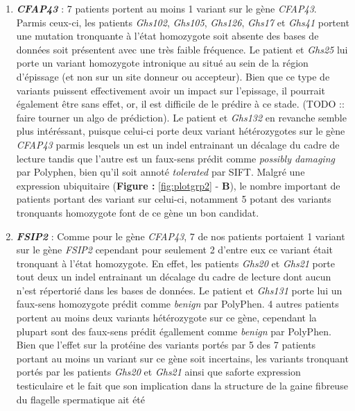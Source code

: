 \documentclass[12pt,twoside]{reedthesis}
\theoremstyle{definition}
\theoremstyle{definition}
\theoremstyle{remark}
\begin{document}
  \begin{enumerate}
  \def\labelenumi{\arabic{enumi}.}
  \item
    \textbf{\emph{CFAP43}} : 7 patients portent au moins 1 variant sur le
    gène \emph{CFAP43}. Parmis ceux-ci, les patients \emph{Ghs102},
    \emph{Ghs105}, \emph{Ghs126}, \emph{Ghs17} et \emph{Ghs41} portent une
    mutation tronquante à l'état homozygote soit absente des bases de
    données soit présentent avec une très faible fréquence. Le patient et
    \emph{Ghs25} lui porte un variant homozygote intronique au situé au
    sein de la région d'épissage (et non sur un site donneur ou
    accepteur). Bien que ce type de variants puissent effectivement avoir
    un impact sur l'epissage, il pourrait également être sans effet, or,
    il est difficile de le prédire à ce stade. (TODO :: faire tourner un
    algo de prédiction). Le patient et \emph{Ghs132} en revanche semble
    plus intéréssant, puisque celui-ci porte deux variant hétérozygotes
    sur le gène \emph{CFAP43} parmis lesquels un est un indel entrainant
    un décalage du cadre de lecture tandis que l'autre est un faux-sens
    prédit comme \emph{possibly damaging} par Polyphen, bien qu'il soit
    annoté \emph{tolerated} par SIFT. Malgré une expression ubiquitaire
    (\textbf{Figure : }\ref{fig:plotgrp2} - \textbf{B}), le nombre
    important de patients portant des variant sur celui-ci, notamment 5
    potant des variants tronquants homozygote font de ce gène un bon
    candidat.\\
  \item
    \textbf{\emph{FSIP2}} : Comme pour le gène \emph{CFAP43}, 7 de nos
    patients portaient 1 variant sur le gène \emph{FSIP2} cependant pour
    seulement 2 d'entre eux ce variant était tronquant à l'état
    homozygote. En effet, les patients \emph{Ghs20} et \emph{Ghs21} porte
    tout deux un indel entrainant un décalage du cadre de lecture dont
    aucun n'est répertorié dans les bases de données. Le patient et
    \emph{Ghs131} porte lui un faux-sens homozygote prédit comme
    \emph{benign} par PolyPhen. 4 autres patients portent au moins deux
    variants hétérozygote sur ce gène, cependant la plupart sont des
    faux-sens prédit égallement comme \emph{benign} par PolyPhen. Bien que
    l'effet sur la protéine des variants portés par 5 des 7 patients
    portant au moins un variant sur ce gène soit incertains, les variants
    tronquant portés par les patients \emph{Ghs20} et \emph{Ghs21} ainsi
    que saforte expression testiculaire et le fait que son implication
    dans la structure de la gaine fibreuse du flagelle spermatique ait été

\end{enumerate}
\end{document}
